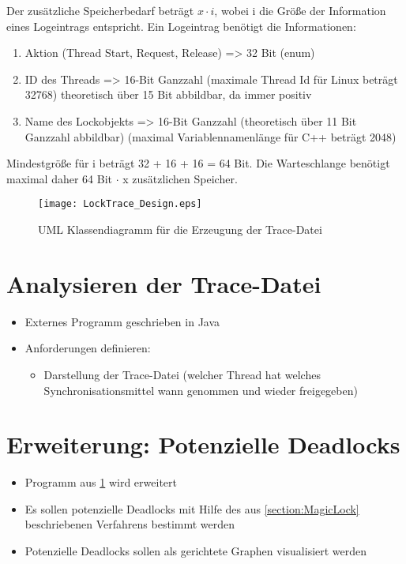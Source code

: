 \begin{itemize}
    Der zusätzliche Speicherbedarf beträgt $x \cdot i$, wobei i die Größe der
    Information eines Logeintrags entspricht. Ein Logeintrag benötigt die
    Informationen:
    \begin{enumerate}
      \item Aktion (Thread Start, Request, Release) => 32 Bit (enum)
      \item ID des Threads => 16-Bit Ganzzahl (maximale Thread Id für Linux
      beträgt 32768) theoretisch über 15 Bit abbildbar, da immer positiv
      \item Name des Lockobjekts => 16-Bit Ganzzahl (theoretisch über 11 Bit
      Ganzzahl abbildbar) (maximal Variablennamenlänge für C++ beträgt 2048)
    \end{enumerate}
    Mindestgröße für i beträgt 32 + 16 + 16 = 64 Bit. Die Warteschlange benötigt
    maximal daher 64 Bit $\cdot$ x zusätzlichen Speicher.
\end{itemize}

\begin{figure}[ht]
  \texttt{[image: LockTrace\_Design.eps]}
  \caption{UML Klassendiagramm für die Erzeugung der Trace-Datei}
  \label{fig:LockTrace_Design}
\end{figure}

\section{Analysieren der Trace-Datei}
\label{section:Analysieren der Trace-Datei}
\begin{itemize}
  \item Externes Programm geschrieben in Java
  \item Anforderungen definieren:
  \begin{itemize}
    \item Darstellung der Trace-Datei (welcher Thread hat welches
    Synchronisationsmittel wann genommen und wieder freigegeben) 
  \end{itemize}
\end{itemize}

\section{Erweiterung: Potenzielle Deadlocks}
\label{section:Erweiterung: Potenzielle Deadlocks}
\begin{itemize}
  \item Programm aus \cref{section:Analysieren der Trace-Datei} wird erweitert
  \item Es sollen potenzielle Deadlocks mit Hilfe des aus \cref{section:MagicLock}
 beschriebenen Verfahrens bestimmt werden
  \item Potenzielle Deadlocks sollen als gerichtete Graphen visualisiert werden
\end{itemize}